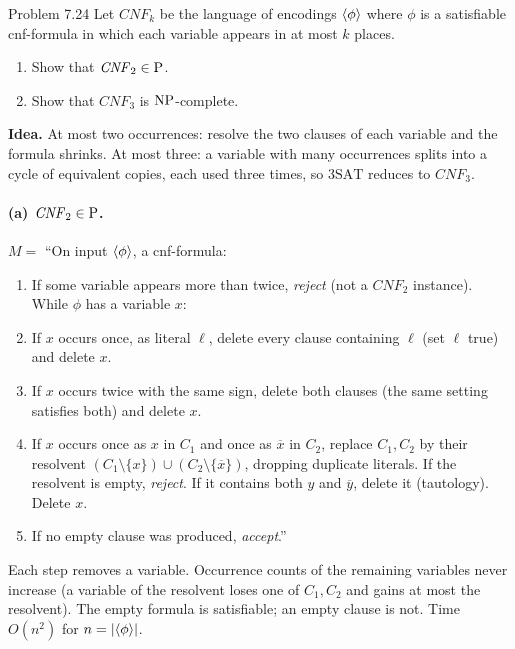 \begin{question}{Problem 7.24}
Let $\mathit{CNF}_k$ be the language of encodings $\langle \phi\rangle$ where $\phi$ is a satisfiable cnf-formula in which each variable appears in at most $k$ places.
\begin{enumerate}[label=\alph*.]
\item Show that $\mathit{CNF}_2\in\mathrm{P}$.
\item Show that $\mathit{CNF}_3$ is $\mathrm{NP}$-complete.
\end{enumerate}
\end{question}
\begin{soln}
\textbf{Idea.} At most two occurrences: resolve the two clauses of each variable and the formula shrinks. At most three: a variable with many occurrences splits into a cycle of equivalent copies, each used three times, so $3\mathrm{SAT}$ reduces to $\mathit{CNF}_3$.

\paragraph{(a) $\mathit{CNF}_2\in\mathrm{P}$.}
$M=$ ``On input $\langle \phi\rangle$, a cnf-formula:
\begin{enumerate}
\item If some variable appears more than twice, \emph{reject} (not a $\mathit{CNF}_2$ instance). While $\phi$ has a variable $x$:
\item \quad If $x$ occurs once, as literal $\ell$, delete every clause containing $\ell$ (set $\ell$ true) and delete $x$.
\item \quad If $x$ occurs twice with the same sign, delete both clauses (the same setting satisfies both) and delete $x$.
\item \quad If $x$ occurs once as $x$ in $C_1$ and once as $\overline{x}$ in $C_2$, replace $C_1,C_2$ by their resolvent $(C_1\setminus\{x\})\cup(C_2\setminus\{\overline{x}\})$, dropping duplicate literals. If the resolvent is empty, \emph{reject}. If it contains both $y$ and $\overline{y}$, delete it (tautology). Delete $x$.
\item If no empty clause was produced, \emph{accept}.''
\end{enumerate}

Each step removes a variable. Occurrence counts of the remaining variables never increase (a variable of the resolvent loses one of $C_1,C_2$ and gains at most the resolvent). The empty formula is satisfiable; an empty clause is not. Time $O(n^2)$ for $n=|\langle \phi\rangle|$.


\end{soln}
